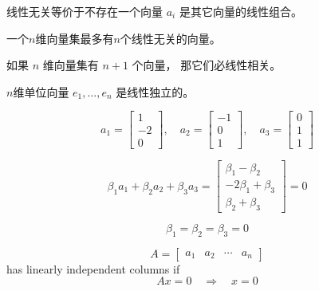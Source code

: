 线性无关等价于不存在一个向量 $ a_{i} $ 是其它向量的线性组合。 

\begin{corollary}
    一个$n$维向量集最多有$n$个线性无关的向量。
\end{corollary}

\begin{corollary}
    如果 $ {n} $ 维向量集有 $ {n}+1 $ 个向量， 那它们必线性相关。
\end{corollary}

\begin{example}
    $n$维单位向量 $ e_{1}, \ldots, e_{n} $ 是线性独立的。 
\end{example}

\begin{example}
    \begin{equation} a_{1}=\left[\begin{array}{c}1 \\ -2 \\ 0\end{array}\right], \quad a_{2}=\left[\begin{array}{c}-1 \\ 0 \\ 1\end{array}\right], \quad a_{3}=\left[\begin{array}{l}0 \\ 1 \\ 1\end{array}\right] \end{equation}

    \begin{equation} \beta_{1} a_{1}+\beta_{2} a_{2}+\beta_{3} a_{3}=\left[\begin{array}{c}\beta_{1}-\beta_{2} \\ -2 \beta_{1}+\beta_{3} \\ \beta_{2}+\beta_{3}\end{array}\right]=0 \end{equation}

    \begin{equation} \beta_{1}=\beta_{2}=\beta_{3}=0 \end{equation}
\end{example}


\begin{corollary}
    \begin{equation}
A=\left[\begin{array}{llll}
a_{1} & a_{2} & \cdots & a_{n}
\end{array}\right]
\end{equation}
has linearly independent columns if
\begin{equation}
A x=0 \quad \Longrightarrow \quad x=0
\end{equation}
\end{corollary}

